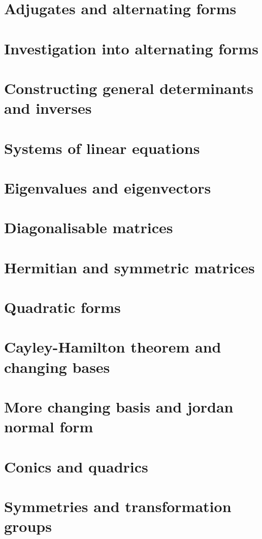 \documentclass{article}
\begin{document}
\section{Adjugates and alternating forms}

\section{Investigation into alternating forms}

\section{Constructing general determinants and inverses}

\section{Systems of linear equations}

\section{Eigenvalues and eigenvectors}

\section{Diagonalisable matrices}

\section{Hermitian and symmetric matrices}

\section{Quadratic forms}

\section{Cayley-Hamilton theorem and changing bases}

\section{More changing basis and jordan normal form}

\section{Conics and quadrics}

\section{Symmetries and transformation groups}

\end{document}
